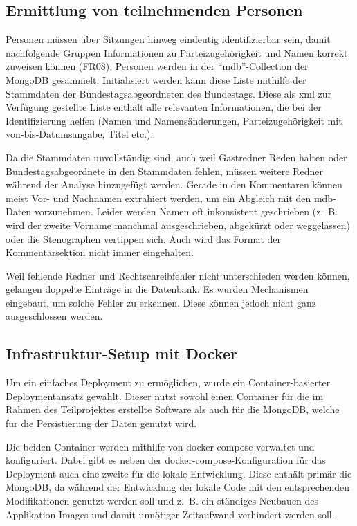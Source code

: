 \subsection{Ermittlung von teilnehmenden Personen}
Personen müssen über Sitzungen hinweg eindeutig identifizierbar sein, damit
nachfolgende Gruppen Informationen zu Parteizugehörigkeit und Namen korrekt
zuweisen können (FR08). Personen werden in der \enquote{mdb}-Collection der MongoDB
gesammelt. Initialisiert werden kann diese Liste mithilfe der Stammdaten der
Bundestagsabgeordneten des Bundestags. Diese als \gls{xml} zur Verfügung gestellte
Liste enthält alle relevanten Informationen, die bei der Identifizierung
helfen (Namen und Namensänderungen, Parteizugehörigkeit mit von-bis-Datumsangabe,
Titel etc.).

Da die Stammdaten unvollständig sind, auch weil Gastredner Reden halten oder
Bundestagsabgeordnete in den Stammdaten fehlen, müssen weitere Redner während
der Analyse hinzugefügt werden. Gerade in den Kommentaren können meist Vor-
und Nachnamen extrahiert werden, um ein Abgleich mit den \gls{mdb}-Daten
vorzunehmen. Leider werden Namen oft inkonsistent geschrieben (z.~B. wird
der zweite Vorname manchmal ausgeschrieben, abgekürzt oder weggelassen) oder
die Stenographen vertippen sich. Auch wird das Format der Kommentarsektion
nicht immer eingehalten.

Weil fehlende Redner und Rechtschreibfehler nicht unterschieden werden können,
gelangen doppelte Einträge in die Datenbank. Es wurden Mechanismen eingebaut,
um solche Fehler zu erkennen. Diese können jedoch nicht ganz ausgeschlossen werden.

\subsection{Infrastruktur-Setup mit Docker}
Um ein einfaches Deployment zu ermöglichen, wurde ein Container-basierter
Deploymentansatz gewählt. Dieser nutzt sowohl einen Container für die im
Rahmen des Teilprojektes erstellte Software als auch für die MongoDB, welche
für die Persistierung der Daten genutzt wird.

Die beiden Container werden mithilfe von docker-compose verwaltet und
konfiguriert. Dabei gibt es neben der docker-compose-Konfiguration für das
Deployment auch eine zweite für die lokale Entwicklung. Diese enthält primär
die MongoDB, da während der Entwicklung der lokale Code mit den entsprechenden
Modifikationen genutzt werden soll und z.~B. ein ständiges Neubauen des
Applikation-Images und damit unnötiger Zeitaufwand verhindert werden soll.

